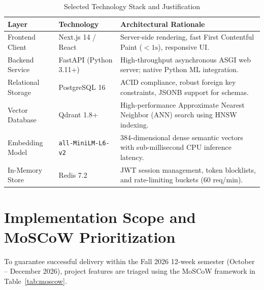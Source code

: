 \documentclass[11pt,a4paper]{article}
\begin{document}
\begin{table}[H]
\centering
\small
\caption{Selected Technology Stack and Justification}
\label{tab:tech_stack}
\begin{tabularx}{\textwidth}{@{}l l X@{}}
\toprule
\textbf{Layer} & \textbf{Technology} & \textbf{Architectural Rationale} \\
\midrule
Frontend Client & Next.js 14 / React & Server-side rendering, fast First Contentful Paint ($<1\text{s}$), responsive UI. \\
Backend Service & FastAPI (Python 3.11+) & High-throughput asynchronous ASGI web server; native Python ML integration. \\
Relational Storage & PostgreSQL 16 & ACID compliance, robust foreign key constraints, JSONB support for schemas. \\
Vector Database & Qdrant 1.8+ & High-performance Approximate Nearest Neighbor (ANN) search using HNSW indexing. \\
Embedding Model & \texttt{all-MiniLM-L6-v2} & 384-dimensional dense semantic vectors with sub-millisecond CPU inference latency. \\
In-Memory Store & Redis 7.2 & JWT session management, token blocklists, and rate-limiting buckets (60 req/min). \\
\bottomrule
\end{tabularx}
\end{table}

\section{Implementation Scope and MoSCoW Prioritization}

To guarantee successful delivery within the Fall 2026 12-week semester (October -- December 2026), project features are triaged using the MoSCoW framework in Table~\ref{tab:moscow}.
\end{document}
